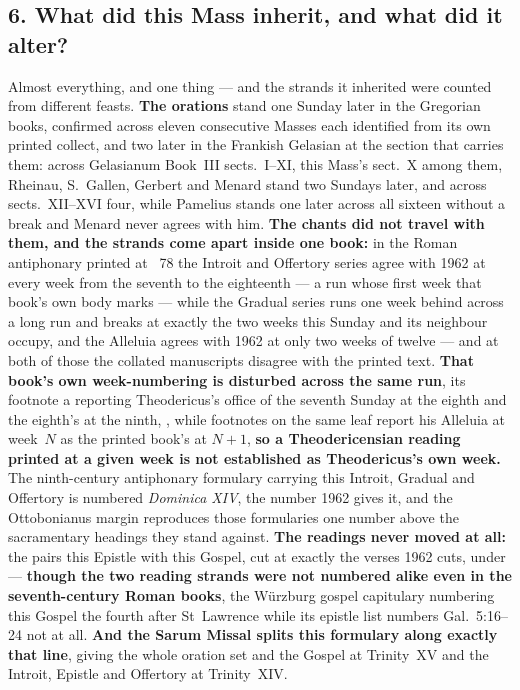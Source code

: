 \subsection*{6. What did this Mass inherit, and what did it alter?}

Almost everything, and one thing --- and the strands it inherited were counted
from different feasts. \textbf{The orations} stand one Sunday later in the
Gregorian books, confirmed across eleven consecutive Masses each identified from
its own printed collect, and two later in the Frankish Gelasian at the section
that carries them: across
Gelasianum Book~III sects.~I--XI, this Mass's sect.~X among them, Rheinau,
S.~Gallen, Gerbert and Menard stand two Sundays later, and across
sects.~XII--XVI four, while Pamelius stands one later across all sixteen without
a break and Menard never agrees with him. \textbf{The chants did not travel
with them, and the strands come apart inside one book:} in the Roman antiphonary
printed at ~78 the Introit and Offertory series agree
with 1962 at every week from the seventh to the eighteenth --- a run whose first
week that book's own body marks  --- while the Gradual series runs one week behind across a long run and
breaks at exactly the two weeks this Sunday and its neighbour occupy, and the
Alleluia agrees with 1962 at only two weeks of twelve --- and at both of those
the collated manuscripts disagree with the printed text. \textbf{That book's own
week-numbering is disturbed across the same run}, its footnote a reporting
Theodericus's office of the seventh Sunday at the eighth and the eighth's at the
ninth, , while footnotes on the same leaf report his
Alleluia at week~$N$ as the printed book's at $N{+}1$, \textbf{so a
Theodericensian reading printed at a given week is not established as
Theodericus's own week.} The ninth-century antiphonary formulary carrying
this Introit, Gradual and Offertory is numbered \emph{Dominica XIV}, the number
1962 gives it, and the Ottobonianus margin reproduces those formularies one
number above the sacramentary headings they stand against. \textbf{The readings
never moved at all:} the  pairs this Epistle with this
Gospel, cut at exactly the verses 1962 cuts, under  --- \textbf{though the two reading strands were not numbered alike
even in the seventh-century Roman books}, the Würzburg gospel capitulary
numbering this Gospel the fourth after St~Lawrence while its epistle list
numbers Gal.\ 5:16--24 not at all. \textbf{And the Sarum Missal splits this
formulary along exactly that line}, giving the whole oration set and the Gospel
at Trinity~XV and the Introit, Epistle and Offertory at Trinity~XIV.

